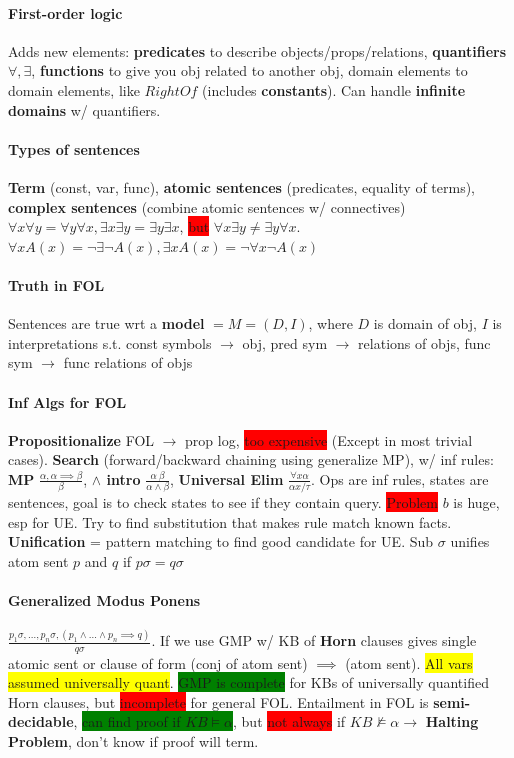 \paragraph{First-order logic} Adds new elements: \textbf{predicates}
to describe objects/props/relations, \textbf{quantifiers} $\forall,\exists$, \textbf{functions} to give you obj related to another obj,
domain elements to domain elements, like $RightOf$ (includes \textbf{constants}). Can handle
\textbf{infinite domains} w/ quantifiers.
\paragraph{Types of sentences} \textbf{Term} (const, var, func),
\textbf{atomic sentences} (predicates, equality of terms),
\textbf{complex sentences} (combine atomic sentences w/ connectives)
\\ $\forall x \forall y = \forall y \forall x, \exists x \exists y =
\exists y \exists x$, \colorbox{red}{but} $\forall x \exists y \neq
\exists y \forall x$. $\forall x A(x)= \neg \exists \neg A(x), \exists
x A(x) = \neg \forall x \neg A(x)$
\paragraph{Truth in FOL} Sentences are true wrt a \textbf{model} $=
M=(D,I)$, where $D$ is domain of obj, $I$ is interpretations
s.t. const symbols $\to$ obj, pred sym $\to$ relations of objs, func
sym $\to$ func relations of objs
\paragraph{Inf Algs for FOL} \textbf{Propositionalize} FOL $\to$ prop
log, \colorbox{red}{too expensive} (Except in most trivial
cases). \textbf{Search} (forward/backward chaining using generalize
MP), w/ inf rules:
\textbf{MP} $\frac{\alpha, \alpha \implies \beta}{\beta}$,
\textbf{$\land$ intro} $\frac{\alpha \  \beta}{\alpha \land \beta}$,
\textbf{Universal Elim} $\frac{\forall x \alpha}{\alpha{x/\tau}}$. Ops
are inf rules, states are sentences, goal is to check states to see if
they contain query. \colorbox{red}{Problem} $b$ is huge, esp for
UE. Try to find substitution that makes rule match known
facts. \textbf{Unification} = pattern matching to find good candidate
for UE. Sub $\sigma$ unifies atom sent $p$ and $q$ if $p\sigma =
q\sigma$
\paragraph{Generalized Modus Ponens} $\frac{p_1\sigma, \ldots,
  p_n\sigma, (p_1 \land \ldots \land p_n \implies q)}{q\sigma}$. If we
use GMP w/ KB of \textbf{Horn} clauses gives single atomic sent or
clause of form (conj of atom sent) $\implies$ (atom sent). \colorbox{yellow}{All vars
  assumed universally quant}. \colorbox{green}{GMP is
  complete} for KBs of universally quantified Horn clauses, but
\colorbox{red}{incomplete} for general FOL. Entailment in FOL is
\textbf{semi-decidable}, \colorbox{green}{can find proof if $KB
  \models \alpha$}, but \colorbox{red}{not always} if $KB \nvDash
\alpha \to$ \textbf{Halting Problem}, don't know if proof will term.
